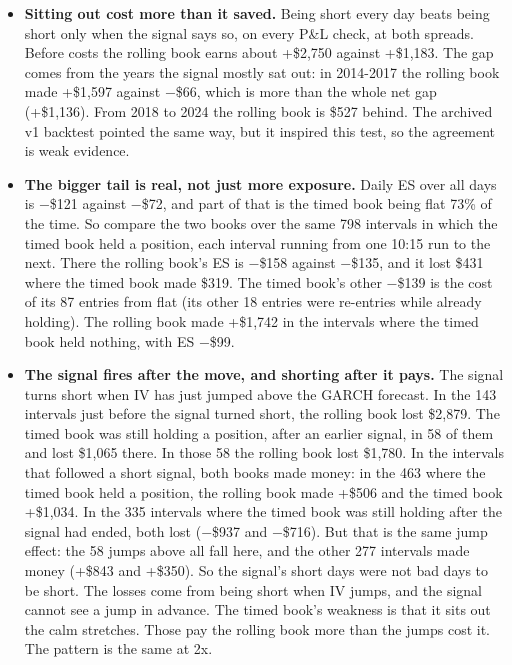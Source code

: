 \documentclass{article}
\begin{document}
\begin{itemize}

\item \textbf{Sitting out cost more than it saved.} Being short every day beats being short only when the signal says so, on every P\&L check, at both spreads. Before costs the rolling book earns about +\$2,750 against +\$1,183. The gap comes from the years the signal mostly sat out: in 2014-2017 the rolling book made +\$1,597 against \ensuremath{-}\$66, which is more than the whole net gap (+\$1,136). From 2018 to 2024 the rolling book is \$527 behind. The archived v1 backtest pointed the same way, but it inspired this test, so the agreement is weak evidence.

\item \textbf{The bigger tail is real, not just more exposure.} Daily ES over all days is \ensuremath{-}\$121 against \ensuremath{-}\$72, and part of that is the timed book being flat 73\% of the time. So compare the two books over the same 798 intervals in which the timed book held a position, each interval running from one 10:15 run to the next. There the rolling book's ES is \ensuremath{-}\$158 against \ensuremath{-}\$135, and it lost \$431 where the timed book made \$319. The timed book's other \ensuremath{-}\$139 is the cost of its 87 entries from flat (its other 18 entries were re-entries while already holding). The rolling book made +\$1,742 in the intervals where the timed book held nothing, with ES \ensuremath{-}\$99.

\item \textbf{The signal fires after the move, and shorting after it pays.} The signal turns short when IV has just jumped above the GARCH forecast. In the 143 intervals just before the signal turned short, the rolling book lost \$2,879. The timed book was still holding a position, after an earlier signal, in 58 of them and lost \$1,065 there. In those 58 the rolling book lost \$1,780. In the intervals that followed a short signal, both books made money: in the 463 where the timed book held a position, the rolling book made +\$506 and the timed book +\$1,034. In the 335 intervals where the timed book was still holding after the signal had ended, both lost (\ensuremath{-}\$937 and \ensuremath{-}\$716). But that is the same jump effect: the 58 jumps above all fall here, and the other 277 intervals made money (+\$843 and +\$350). So the signal's short days were not bad days to be short. The losses come from being short when IV jumps, and the signal cannot see a jump in advance. The timed book's weakness is that it sits out the calm stretches. Those pay the rolling book more than the jumps cost it. The pattern is the same at 2x.


\end{itemize}
\end{document}
